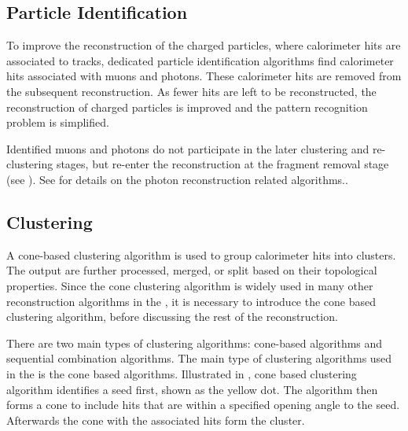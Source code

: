 \subsection{Particle Identification}
\label{sec:particleID}

To improve the reconstruction of the charged particles, where calorimeter hits are associated to tracks, dedicated particle identification algorithms find calorimeter hits associated with muons and photons. These calorimeter hits are removed from the subsequent reconstruction. As fewer hits are left to be reconstructed, the reconstruction of charged particles is improved and the pattern recognition problem is simplified.

Identified muons and photons do not participate in the later clustering and re-clustering stages, but re-enter the reconstruction at the fragment removal stage (see ). See  for details on the photon reconstruction  related algorithms..


\subsection{Clustering}
\label{sec:pandoraConeCluster}

A cone-based clustering algorithm is used to group calorimeter hits into clusters. The output \clusters are further processed, merged, or split based on their topological properties. Since the cone clustering algorithm is widely used in many other reconstruction algorithms in the \pandora, it is necessary to introduce the cone based clustering algorithm, before discussing the rest of the \pandora reconstruction.

There are two main types of clustering algorithms: cone-based algorithms and sequential combination algorithms. The main type of clustering algorithms used in the  \pandora is the cone based algorithms. Illustrated in , cone based clustering algorithm identifies a seed first, shown as the yellow dot. The algorithm then forms a cone to include hits that are within a specified opening angle to the seed. Afterwards the cone with the associated hits form the cluster.




